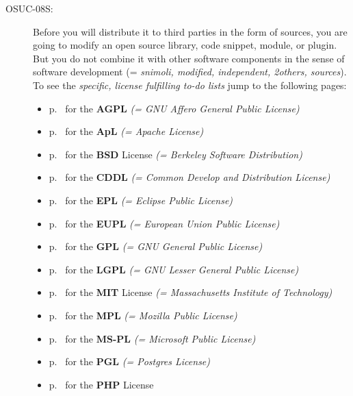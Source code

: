 \begin{description}
\item[OSUC-08S:]\label{OSUC-08S-DEF} Before you will distribute it to third
parties in the form of sources, you are going to modify an open source library,
code snippet, module, or plugin. But you do not combine it with other software
components in the sense of software development (= \textit{snimoli, modified,
independent, 2others, sources}). To see the \textit{specific, license fulfilling
to-do lists} jump to the following pages:
  \begin{itemize}
    \item p.\ \pageref{OSUC-08S-AGPL} for the \textbf{AGPL}
      \textit{(= GNU Affero General Public License)} 
    \item p.\ \pageref{OSUC-08S-Apache20} for the \textbf{ApL}
      \textit{(= Apache License)}
    \item p.\ \pageref{OSUC-08S-BSD} for the \textbf{BSD} License
      \textit{(= Berkeley Software Distribution)}
    \item p.\ \pageref{OSUC-08S-CDDL} for the \textbf{CDDL}
      \textit{(= Common Develop and Distribution License)}  
    \item p.\ \pageref{OSUC-08S-EPL} for the \textbf{EPL}
      \textit{(= Eclipse Public License)}     
    \item p.\ \pageref{OSUC-08S-EUPL} for the \textbf{EUPL}
      \textit{(= European Union Public License)} 
    \item p.\ \pageref{OSUC-08S-GPL} for the \textbf{GPL}
       \textit{(= GNU General Public License)} 
    \item p.\ \pageref{OSUC-08S-LGPL} for the \textbf{LGPL}
      \textit{(= GNU Lesser General Public License)}           
    \item p.\ \pageref{OSUC-08S-MIT} for the \textbf{MIT} License
       \textit{(= Massachusetts Institute of Technology)} 
    \item p.\ \pageref{OSUC-08S-MPL} for the \textbf{MPL}
      \textit{(= Mozilla Public License)}     
    \item p.\ \pageref{OSUC-08S-MS-PL} for the \textbf{MS-PL}
      \textit{(= Microsoft Public License)} 
    \item p.\ \pageref{OSUC-08S-PGL} for the \textbf{PGL}
      \textit{(= Postgres License)} 
    \item p.\ \pageref{OSUC-08S-PHP} for the \textbf{PHP} License 
  \end{itemize}


\end{description}
